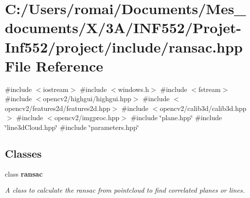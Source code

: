 \section{C\+:/\+Users/romai/\+Documents/\+Mes\+\_\+documents/\+X/3\+A/\+I\+N\+F552/\+Projet-\/\+Inf552/project/include/ransac.hpp File Reference}
\label{ransac_8hpp}
{\ttfamily \#include $<$iostream$>$}\newline
{\ttfamily \#include $<$windows.\+h$>$}\newline
{\ttfamily \#include $<$fstream$>$}\newline
{\ttfamily \#include $<$opencv2/highgui/highgui.\+hpp$>$}\newline
{\ttfamily \#include $<$opencv2/features2d/features2d.\+hpp$>$}\newline
{\ttfamily \#include $<$opencv2/calib3d/calib3d.\+hpp$>$}\newline
{\ttfamily \#include $<$opencv2/imgproc.\+hpp$>$}\newline
{\ttfamily \#include \char`\"{}plane.\+hpp\char`\"{}}\newline
{\ttfamily \#include \char`\"{}line3d\+Cloud.\+hpp\char`\"{}}\newline
{\ttfamily \#include \char`\"{}parameters.\+hpp\char`\"{}}\newline
\subsection*{Classes}
\begin{DoxyCompactItemize}
\item 
class \textbf{ ransac}
\begin{DoxyCompactList}\small\item\em A class to calculate the ransac from pointcloud to find correlated planes or lines. \end{DoxyCompactList}\end{DoxyCompactItemize}
